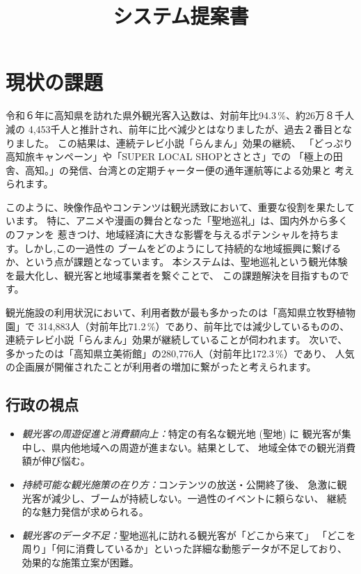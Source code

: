 \documentclass{docs}
\title{システム提案書}
\begin{document}
\section{現状の課題}
令和６年に高知県を訪れた県外観光客入込数は、対前年比94.3\,\%、約26万８千人減の
4,453千人と推計され、前年に比べ減少とはなりましたが、過去２番目となりました。
この結果は、連続テレビ小説「らんまん」効果の継続、
「どっぷり高知旅キャンペーン」や「SUPER LOCAL SHOPとさとさ」での
「極上の田舎、高知。」の発信、台湾との定期チャーター便の通年運航等による効果と
考えられます。

このように、映像作品やコンテンツは観光誘致において、重要な役割を果たしています。
特に、アニメや漫画の舞台となった「聖地巡礼」は、国内外から多くのファンを
惹きつけ、地域経済に大きな影響を与えるポテンシャルを持ちます。しかし,この一過性の
ブームをどのようにして持続的な地域振興に繋げるか、という点が課題となっています。
本システムは、聖地巡礼という観光体験を最大化し、観光客と地域事業者を繋ぐことで、
この課題解決を目指すものです。

観光施設の利用状況において、利用者数が最も多かったのは「高知県立牧野植物園」で
314,883人（対前年比71.2\,\%）であり、前年比では減少しているものの、
連続テレビ小説「らんまん」効果が継続していることが伺われます。
次いで、多かったのは「高知県立美術館」の280,776人（対前年比172.3\,\%）であり、
人気の企画展が開催されたことが利用者の増加に繋がったと考えられます。

\subsection{行政の視点}
\begin{itemize}
	\item \emph{観光客の周遊促進と消費額向上：}特定の有名な観光地 (聖地) に
	観光客が集中し、県内他地域への周遊が進まない。結果として、
	地域全体での観光消費額が伸び悩む。
	\item \emph{持続可能な観光施策の在り方：}コンテンツの放送・公開終了後、
	急激に観光客が減少し、ブームが持続しない。一過性のイベントに頼らない、
	継続的な魅力発信が求められる。
	\item \emph{観光客のデータ不足：}聖地巡礼に訪れる観光客が「どこから来て」
	「どこを周り」「何に消費しているか」といった詳細な動態データが不足しており、
	効果的な施策立案が困難。
\end{itemize}
\end{document}
